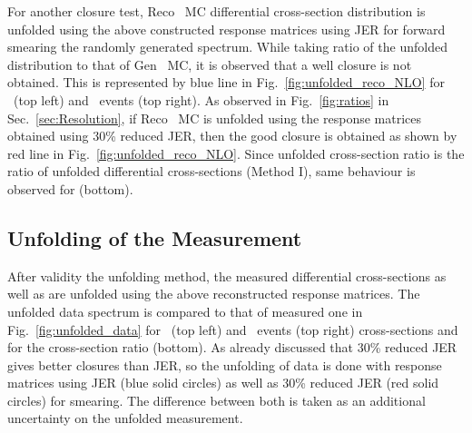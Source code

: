 For another closure test, Reco \MGP~MC differential cross-section distribution is unfolded using the above constructed response matrices using JER for forward smearing the randomly generated spectrum. While taking ratio of the unfolded distribution to that of Gen \MGP~MC, it is observed that a well closure is not obtained. This is represented by blue line in Fig.~\ref{fig:unfolded_reco_NLO} for \njt~(top left) and \njth~events (top right). As observed in Fig.~\ref{fig:ratios} in Sec.~\ref{sec:Resolution}, if Reco \MGP~MC is unfolded using the response matrices obtained using 30\% reduced JER, then the good closure is obtained as shown by red line in Fig.~\ref{fig:unfolded_reco_NLO}. Since unfolded cross-section ratio \ratio is the ratio of unfolded differential cross-sections (Method I), same behaviour is observed for \ratio (bottom). 

\subsection{Unfolding of the Measurement}
\label{subsec:unf}
After validity the unfolding method, the measured differential cross-sections as well as \ratio are unfolded using the above reconstructed response matrices. The unfolded data spectrum is compared to that of measured one in Fig.~\ref{fig:unfolded_data} for \njt~(top left) and \njth~events (top right) cross-sections and for the cross-section ratio \ratio (bottom). As already discussed that 30\% reduced JER gives better closures than JER, so the unfolding of data is done with response matrices using JER (blue solid circles) as well as 30\% reduced JER (red solid circles) for smearing. The difference between both is taken as an additional uncertainty on the unfolded measurement. %

